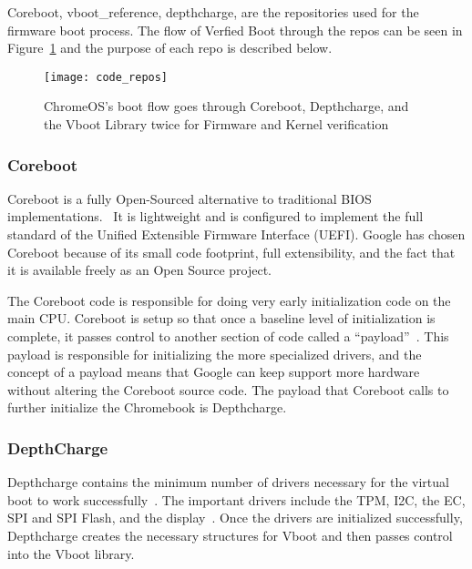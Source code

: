 \documentclass[../report.tex]{subfiles}
\begin{document}
Coreboot, vboot\_reference, depthcharge, are the repositories used for the firmware boot process.
The flow of Verfied Boot through the repos can be seen in Figure~\ref{fig:code_repos} and the purpose of each repo is described below.

\begin{figure}
  \centering
  \texttt{[image: code\_repos]}
  \caption{ChromeOS's boot flow goes through Coreboot, Depthcharge, and the Vboot Library twice for Firmware and Kernel verification}
  \label{fig:code_repos}
\end{figure}

\subsubsection{Coreboot}

Coreboot is a fully Open-Sourced alternative to traditional BIOS implementations.~\cite{coreboot}
It is lightweight and is configured to implement the full standard of the Unified Extensible Firmware Interface (UEFI).
Google has chosen Coreboot because of its small code footprint, full extensibility, and the fact that it is available freely as an Open Source project.

The Coreboot code is responsible for doing very early initialization code on the main CPU\@. 
Coreboot is setup so that once a baseline level of initialization is complete, it passes control to another section of code called a ``payload''~\cite{coreboot-payload}.
This payload is responsible for initializing the more specialized drivers, and the concept of a payload means that Google can keep support more hardware without altering the Coreboot source code.
The payload that Coreboot calls to further initialize the Chromebook is Depthcharge.


\subsubsection{DepthCharge}

Depthcharge contains the minimum number of drivers necessary for the virtual boot to work successfully~\cite{depthcharge-codebase}. 
The important drivers include the TPM, I2C, the EC, SPI and SPI Flash, and the display~\cite{depthcharge-slides}.
Once the drivers are initialized successfully, Depthcharge creates the necessary structures for Vboot and then passes control into the Vboot library.
\end{document}
